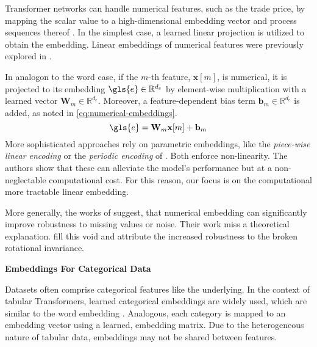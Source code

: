 Transformer networks can handle numerical features, such as the trade price, by mapping the scalar value to a high-dimensional embedding vector and process sequences thereof \autocite[][3]{gorishniyEmbeddingsNumericalFeatures2022}. In the simplest case, a learned linear projection is utilized to obtain the embedding. Linear embeddings of numerical features were previously explored in \textcites[][3]{kossenSelfAttentionDatapointsGoing2021}[][4]{somepalliSaintImprovedNeural2021}[][4]{gorishniyRevisitingDeepLearning2021}.

In analogon to the word case, if the $m$-th feature, $\mathbf{x}[m]$, is numerical, it is projected to its embedding $\gls{e} \in \mathbb{R}^{d_e}$ by element-wise multiplication with a learned vector $\mathbf{W}_m \in \mathbb{R}^{d_{e}}$. Moreover, a feature-dependent bias term $\mathbf{b}_m \in \mathbb{R}^{d_{e}}$ is added, as noted in \cref{eq:numerical-embeddings}.
\begin{equation}
    \gls{e}= \mathbf{W}_m \mathbf{x}[m] +\mathbf{b}_m
    \label{eq:numerical-embeddings}
\end{equation}
More sophisticated approaches rely on parametric embeddings, like the \emph{piece-wise linear encoding} or the \emph{periodic encoding} of \textcite[][10]{gorishniyEmbeddingsNumericalFeatures2022}. Both enforce non-linearity. The authors show that these can alleviate the model's performance but at a non-neglectable computational cost. For this reason, our focus is on the computational more tractable linear embedding.

More generally, the works of \textcites[][1]{gorishniyEmbeddingsNumericalFeatures2022}[][1]{somepalliSaintImprovedNeural2021} suggest, that numerical embedding can significantly improve robustness to missing values or noise. Their work miss a theoretical explanation. \textcite[][8--9]{grinsztajnWhyTreebasedModels2022} fill this void and attribute the increased robustness to the broken rotational invariance.

\textbf{Embeddings For Categorical Data}

Datasets often comprise categorical features like the underlying. In the context of tabular Transformers, learned categorical embeddings are widely used, which are similar to the word embedding
\autocites[][4]{gorishniyRevisitingDeepLearning2021}[][2]{huangTabTransformerTabularData2020}[][4]{somepalliSaintImprovedNeural2021}. Analogous, each category is mapped to an embedding vector using a learned, embedding matrix. Due to the heterogeneous nature of tabular data, embeddings may not be shared between features.


